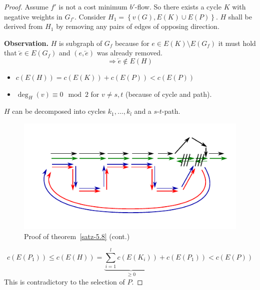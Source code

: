 \documentclass[a4paper]{article}
\theoremstyle{definition}
\newcommand{\set}[1]{\left\{#1\right\}}
\newcommand{\gath}[2]{$#1$-$#2$-path} %
\begin{document}
\begin{proof}
  Assume $f'$ is not a cost minimum $b'$-flow. So there exists a cycle $K$ with negative weights in $G_{f'}$.
  Consider $H_1 = \set{v(G), E(K) \cup E(P)}$. $H$ shall be derived from $H_1$ by removing any pairs of edges of opposing direction.

  \textbf{Observation.} $H$ is subgraph of $G_f$ because for $e \in E(K) \setminus E(G_f)$ it must hold that $\overleftarrow{e} \in E(G_f)$ and $(e, \overleftarrow{e})$ was already removed.
  \[ \Rightarrow \overleftarrow{e} \notin E(H) \]

  \begin{itemize}
    \item $c(E(H)) = c(E(K)) + c(E(P)) < c(E(P))$
    \item $\deg_H(v) \equiv 0 \mod{2}$ for $v \neq s, t$ (because of cycle and path).
  \end{itemize}

  $H$ can be decomposed into cycles $k_1, \ldots, k_l$ and a \gath st.

  \begin{figure}[ht]
   \begin{center}
    \includegraphics{img/satz_5_8_proof.pdf}
    \caption{Proof of theorem~\ref{satz-5.8} (cont.)}
   \end{center}
  \end{figure}

  \[ c(E(P_1)) \leq c(E(H)) = \underbrace{\sum_{i=1}^l c(E(K_i))}_{\geq 0} + c(E(P_1)) < c(E(P)) \]
  This is contradictory to the selection of $P$.
\end{proof}
\end{document}

